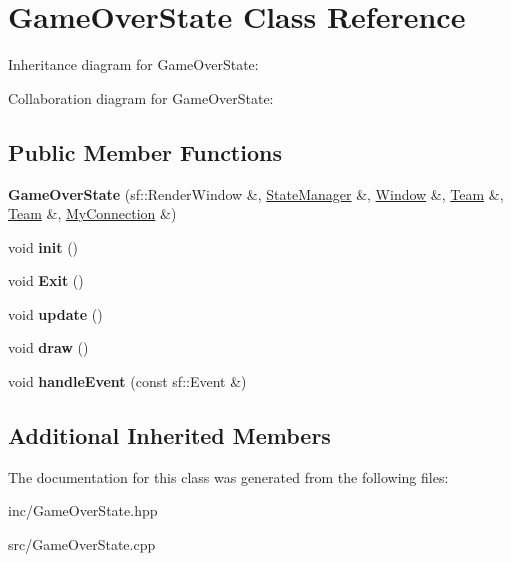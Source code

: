 \hypertarget{class_game_over_state}{\section{Game\+Over\+State Class Reference}
\label{class_game_over_state}
}


Inheritance diagram for Game\+Over\+State\+:


Collaboration diagram for Game\+Over\+State\+:
\subsection*{Public Member Functions}
\begin{DoxyCompactItemize}
\item 
\hypertarget{class_game_over_state_a17942bfd6509da33206a1dbd13725a91}{{\bfseries Game\+Over\+State} (sf\+::\+Render\+Window \&, \hyperlink{class_state_manager}{State\+Manager} \&, \hyperlink{class_window}{Window} \&, \hyperlink{class_team}{Team} \&, \hyperlink{class_team}{Team} \&, \hyperlink{class_my_connection}{My\+Connection} \&)}\label{class_game_over_state_a17942bfd6509da33206a1dbd13725a91}

\item 
\hypertarget{class_game_over_state_acad1ee89e5f1edb9c8d39c8275725135}{void {\bfseries init} ()}\label{class_game_over_state_acad1ee89e5f1edb9c8d39c8275725135}

\item 
\hypertarget{class_game_over_state_ab55e2bed741f651ea8cd451f5748c196}{void {\bfseries Exit} ()}\label{class_game_over_state_ab55e2bed741f651ea8cd451f5748c196}

\item 
\hypertarget{class_game_over_state_ad97f19159736354b360b4737c87bbe82}{void {\bfseries update} ()}\label{class_game_over_state_ad97f19159736354b360b4737c87bbe82}

\item 
\hypertarget{class_game_over_state_a9decc1411647e390bfed0bdc009cd691}{void {\bfseries draw} ()}\label{class_game_over_state_a9decc1411647e390bfed0bdc009cd691}

\item 
\hypertarget{class_game_over_state_ad68f203a496847e3772642d9b4fbb8e9}{void {\bfseries handle\+Event} (const sf\+::\+Event \&)}\label{class_game_over_state_ad68f203a496847e3772642d9b4fbb8e9}

\end{DoxyCompactItemize}
\subsection*{Additional Inherited Members}


The documentation for this class was generated from the following files\+:\begin{DoxyCompactItemize}
\item 
inc/Game\+Over\+State.\+hpp\item 
src/Game\+Over\+State.\+cpp\end{DoxyCompactItemize}
